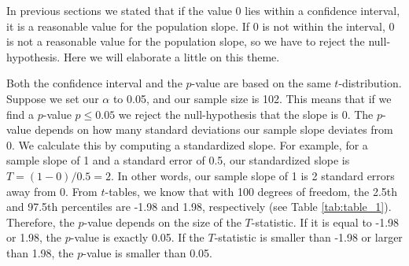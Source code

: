 \documentclass[]{report}\usepackage[]{graphicx}\usepackage[]{color}
\begin{document}
%
%
%


In previous sections we stated that if the value 0 lies within a confidence interval, it is a reasonable value for the population slope. If 0 is not within the interval, 0 is not a reasonable value for the population slope, so we have to reject the null-hypothesis. Here we will elaborate a little on this theme.

Both the confidence interval and the $p$-value are based on the same $t$-distribution. Suppose we set our $\alpha$ to 0.05, and our sample size is 102. This means that if we find a $p$-value $p \leq 0.05$ we reject the null-hypothesis that the slope is 0. The $p$-value depends on how many standard deviations our sample slope deviates from 0. We calculate this by computing a standardized slope. For example, for a sample slope of 1 and a standard error of 0.5, our standardized slope is $T=(1-0)/0.5=2$. In other words, our sample slope of 1 is 2 standard errors away from 0. From $t$-tables, we know that with 100 degrees of freedom, the 2.5th and 97.5th percentiles are -1.98 and 1.98, respectively (see Table \ref{tab:table_1}). Therefore, the $p$-value depends on the size of the $T$-statistic. If it is equal to -1.98 or 1.98, the $p$-value is exactly 0.05. If the $T$-statistic is smaller than -1.98 or larger than 1.98, the $p$-value is smaller than 0.05.
\end{document}

